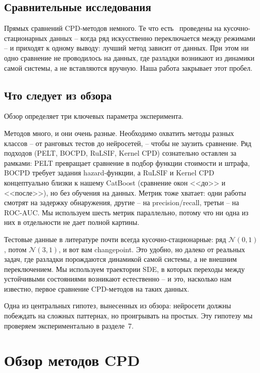 \documentclass[12pt,a4paper]{article}
\begin{document}
\subsection{Сравнительные исследования}

Прямых сравнений CPD-методов немного. Те что есть~\cite{truong2020, liu2013, hushchyn2020} проведены на кусочно-стационарных данных  -- когда ряд искусственно переключается между режимами  -- и приходят к одному выводу: лучший метод зависит от данных. При этом ни одно сравнение не проводилось на данных, где разладки возникают из динамики самой системы, а не вставляются вручную. Наша работа закрывает этот пробел.

\subsection{Что следует из обзора}

Обзор определяет три ключевых параметра эксперимента.

Методов много, и они очень разные. Необходимо охватить методы разных классов  -- от ранговых тестов до нейросетей,  -- чтобы не заузить сравнение. Ряд подходов (PELT, BOCPD, RuLSIF, Kernel CPD) сознательно оставлен за рамками: PELT превращает сравнение в подбор функции стоимости и штрафа, BOCPD требует задания hazard-функции, а RuLSIF и Kernel CPD концептуально близки к нашему CatBoost (сравнение окон <<до>> и <<после>>), но без обучения на данных. Метрик тоже хватает: одни работы смотрят на задержку обнаружения, другие  -- на precision/recall, третьи  -- на ROC-AUC. Мы используем шесть метрик параллельно, потому что ни одна из них в отдельности не дает полной картины.

Тестовые данные в литературе почти всегда кусочно-стационарные: ряд $\mathcal{N}(0,1)$, потом $\mathcal{N}(3,1)$, и вот вам changepoint. Это удобно, но далеко от реальных задач, где разладки порождаются динамикой самой системы, а не внешним переключением. Мы используем траектории SDE, в которых переходы между устойчивыми состояниями возникают естественно  -- и это, насколько нам известно, первое сравнение CPD-методов на таких данных.

Одна из центральных гипотез, вынесенных из обзора: нейросети должны побеждать на сложных паттернах, но проигрывать на простых. Эту гипотезу мы проверяем экспериментально в разделе~7.


\section{Обзор методов CPD}
\end{document}
